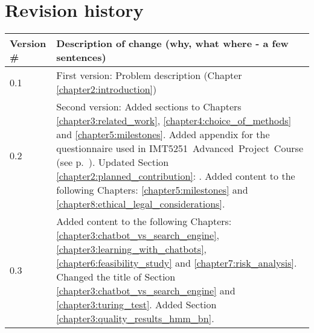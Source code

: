 \chapter*{Revision history}

\begin{center}
	\begin{tabular}[H]{|l|p{35em}|}
		\hline
		Version \#  & Description of change (why, what where - a few sentences)\\
		\hline
		0.1   & First version: Problem description (Chapter \ref{chapter2:introduction})\\
		\hline
		0.2   & Second version: Added sections to Chapters \ref{chapter3:related_work}, \ref{chapter4:choice_of_methods} and \ref{chapter5:milestones}. 
		\newline  
		Added appendix for the questionnaire used in \newline IMT5251~Advanced~Project~Course (see p.~\pageref{appendix:questionnaire}).
		\newline  
		Updated Section \ref{chapter2:planned_contribution}: \nameref{chapter2:planned_contribution}.
		\newline  
		Added content to the following Chapters: \ref{chapter5:milestones} and \ref{chapter8:ethical_legal_considerations}. \\
		\hline
		0.3   & Added content to the following Chapters: \ref{chapter3:chatbot_vs_search_engine}, \ref{chapter3:learning_with_chatbots}, 
		\ref{chapter6:feasibility_study} and \ref{chapter7:risk_analysis}. \newline
		Changed the title of Section \ref{chapter3:chatbot_vs_search_engine} and \ref{chapter3:turing_test}. 
		Added Section \ref{chapter3:quality_results_hmm_bn}.
		\\		
		\hline
	\end{tabular}
\end{center}
